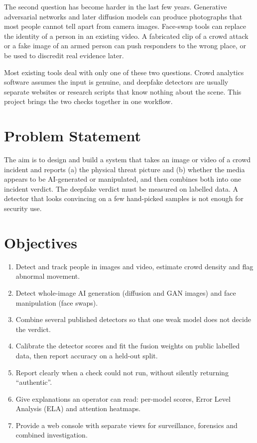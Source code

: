 \documentclass[12pt,a4paper,oneside]{report}
\begin{document}
The second question has become harder in the last few years. Generative adversarial networks\cite{goodfellow2014} and later diffusion models\cite{ho2020,rombach2022} can produce photographs that most people cannot tell apart from camera images. Face-swap tools can replace the identity of a person in an existing video\cite{tolosana2020}. A fabricated clip of a crowd attack or a fake image of an armed person can push responders to the wrong place, or be used to discredit real evidence later.

Most existing tools deal with only one of these two questions. Crowd analytics software assumes the input is genuine, and deepfake detectors are usually separate websites or research scripts that know nothing about the scene. This project brings the two checks together in one workflow.

\section{Problem Statement}
The aim is to design and build a system that takes an image or video of a crowd incident and reports (a) the physical threat picture and (b) whether the media appears to be AI-generated or manipulated, and then combines both into one incident verdict. The deepfake verdict must be measured on labelled data. A detector that looks convincing on a few hand-picked samples is not enough for security use.

\section{Objectives}
\begin{enumerate}
  \item Detect and track people in images and video, estimate crowd density and flag abnormal movement.
  \item Detect whole-image AI generation (diffusion and GAN images) and face manipulation (face swaps).
  \item Combine several published detectors so that one weak model does not decide the verdict.
  \item Calibrate the detector scores and fit the fusion weights on public labelled data, then report accuracy on a held-out split.
  \item Report clearly when a check could not run, without silently returning ``authentic''.
  \item Give explanations an operator can read: per-model scores, Error Level Analysis (ELA) and attention heatmaps.
  \item Provide a web console with separate views for surveillance, forensics and combined investigation.
\end{enumerate}
\end{document}
